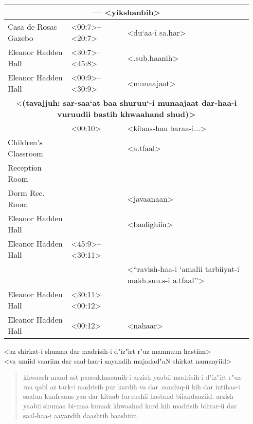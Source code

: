 \documentclass[12pt]{arabart}
\begin{document}
\begin{longtable}[c]{p{1.75in}|p{1.1in}|p{2.75in}}
\multicolumn{3}{c}{ --- <yikshanbih>} \\
\hline
Casa de Rosas Gazebo & <00:7>--<20:7> & \hfill <du`aa-i sa.har> \\
Eleanor Hadden Hall & <30:7>--<45:8> & \hfill <.sub.haanih> \\
Eleanor Hadden Hall & <00:9>--<30:9> & \hfill <munaajaat> \vspace{1.5ex} \\
\multicolumn{3}{c}{<\bf (tavajjuh: sar-saa`at baa shuruu`-i munaajaat dar-haa-i vuruudii bastih khwaahand shud)>} \vspace{1.5ex} \\
 & <00:10> & \hfill <kilaas-haa baraa-i...> \\
Children's Classroom & & \hfill <a.tfaal> \\
Reception Room & &  \\
Dorm Rec. Room & & \hfill <javaanaan> \\
Eleanor Hadden Hall & & \hfill <baalighiin> \vspace{1.5ex} \\
Eleanor Hadden Hall & <45:9>--<30:11> &  \\
 & & \hfill <``ravish-haa-i `amalii tarbiiyat-i makh.suu.s-i a.tfaal''> \vspace{1.5ex} \\
Eleanor Hadden Hall & <30:11>--<00:12> &  \\
Eleanor Hadden Hall & <00:12> & \hfill <nahaar> \\
\hline
\end{longtable}

\begin{center}
{\Large <az shirkat-i shumaa dar madrisih-i d"iz"irt r"uz mamnuun hastiim> \\
  <va umiid vaariim dar saal-haa-i aayandih mujadad"aN shirkat namaayiid>}
\end{center}

\begin{quote}
\begin{RLtext}
\noindent
khwaash-mand ast paasukhnaamih-i arzish yaabii madrisih-i d"iz"irt
r"uz-raa qabl az tark-i madrisih pur kardih va dar .sanduq-ii kih dar
intihaa-i saalun kunfraans yaa dar kitaab furuushii hastand
biiandaaziid. arzish yaabii shumaa bi-maa kumak khwaahad kard kih
madrisih bihtar-ii dar saal-haa-i aayandih daashtih baashiim.
\end{RLtext}
\end{quote}
\end{document}
